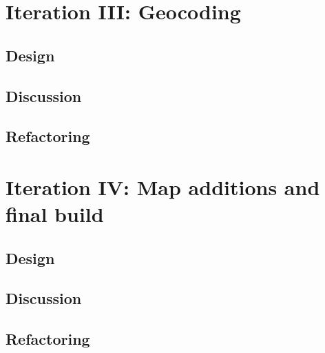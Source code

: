 \section{Iteration III: Geocoding}
\subsection{Design}

\subsection{Discussion}

\subsection{Refactoring}

\section{Iteration IV: Map additions and final build}

\subsection{Design}

\subsection{Discussion}

\subsection{Refactoring}